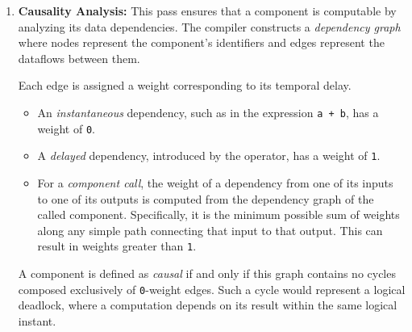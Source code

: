 \begin{enumerate}
          The reactive type system addresses this by classifying all flows as either
          \emph{continuous} or \emph{discrete}. It then enforces rules that prevent continuous flows
          from improperly influencing stateful computations. The soundness of this approach is
          formally established by the \emph{Oversampling Theorem}
          (), which proves that well-typed programs
          are immune to such inconsistencies.

    \item \textbf{Causality Analysis:} This pass ensures that a component is computable by analyzing
          its data dependencies. The compiler constructs a \emph{dependency graph} where nodes
          represent the component's identifiers and edges represent the dataflows between them.

          Each edge is assigned a weight corresponding to its temporal delay.
          \begin{itemize}
              \item An \emph{instantaneous} dependency, such as in the expression \texttt{a + b},
                    has a weight of \texttt{0}.
              \item A \emph{delayed} dependency, introduced by the  operator, has a
                    weight of \texttt{1}.
              \item For a \emph{component call}, the weight of a dependency from one of its inputs
                    to one of its outputs is computed from the dependency graph of the called
                    component. Specifically, it is the minimum possible sum of weights along any
                    simple path connecting that input to that output. This can result in weights
                    greater than \texttt{1}.
          \end{itemize}

          A component is defined as \emph{causal} if and only if this graph contains no cycles
          composed exclusively of \texttt{0}-weight edges. Such a cycle would represent a logical
          deadlock, where a computation depends on its result within the same logical instant.


\end{enumerate}
